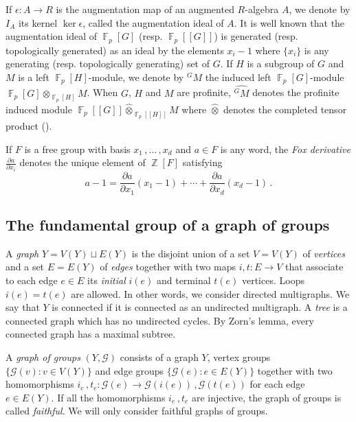 \documentclass[a4paper]{amsart}
\theoremstyle{definition}
\theoremstyle{remark}
\DeclareMathOperator{\bbz}{\mathbb{Z}}
\DeclareMathOperator{\bbf}{\mathbb{F}}
\newcommand{\Falgebra}[1]{\bbf_p[#1]}
\newcommand{\FFalgebra}[1]{\bbf_p[\![#1]\!]}
\newcommand{\G}{\mathcal G}
\begin{document}
If \(\epsilon\colon A \to R\) is the augmentation map of an augmented \(R\)-algebra \(A\), we denote by \(I_A\) its kernel \(\ker \epsilon\), called the augmentation ideal of \(A\). It is well known that the augmentation ideal of \(\Falgebra{G}\) (resp. \(\FFalgebra{G}\)) is generated (resp. topologically generated) as an ideal by the elements \(x_i - 1\) where \(\{x_i\}\) is any generating (resp. topologically generating) set of \(G\). If \(H\) is a subgroup of \(G\) and \(M\) is a left \(\Falgebra{H}\)-module, we denote by \({^GM}\) the induced left \(\Falgebra{G}\)-module \(\Falgebra{G} \otimes_{\Falgebra{H}} M\). When \(G\), \(H\) and \(M\) are profinite, \(\widehat{^GM}\) denotes the profinite induced module \(\FFalgebra{G} \widehat{\otimes}_{\FFalgebra{H}} M\) where \(\widehat{\otimes}\) denotes the completed tensor product (\cite[Sec. 5.5]{RibesZalesskii2010}).

If \(F\) is a free group with basis \(x_1\,,\ldots\,,x_d\) and \(a \in F\) is any word, the \emph{Fox derivative} \(\frac{\partial a}{\partial x_i}\) denotes the unique element of \(\bbz[F]\) satisfying \[a - 1 = \frac{\partial a}{\partial x_1}(x_1-1) + \cdots + \frac{\partial a}{\partial x_d}(x_d-1)\,.\]

\subsection{The fundamental group of a graph of groups}

A \emph{graph} \(Y = V(Y) \sqcup E(Y)\) is the disjoint union of a set \(V = V(Y)\) of \emph{vertices} and a set \(E = E(Y)\) of \emph{edges} together with two maps \(i,t\colon E \to V\) that associate to each edge \(e \in E\) its \emph{initial} \(i(e)\) and terminal \(t(e)\) vertices. Loops \(i(e) = t(e)\) are allowed. In other words, we consider directed multigraphs. We say that \(Y\) is connected if it is connected as an undirected multigraph. A \emph{tree} is a connected graph which has no undirected cycles. By Zorn's lemma, every connected graph has a maximal subtree.

A \emph{graph of groups} \((Y, \G)\) consists of a graph \(Y\), vertex groups \(\{\G(v) \colon v \in V(Y)\}\) and edge groups \(\{\G(e)\colon e \in E(Y)\}\) together with two homomorphisms \(i_e\,, t_e\colon \G(e) \to \G(i(e))\,, \G(t(e))\) for each edge \(e \in E(Y)\). If all the homomorphisms \(i_e\,, t_e\) are injective, the graph of groups is called \emph{faithful}. We will only consider faithful graphs of groups.
\end{document}
